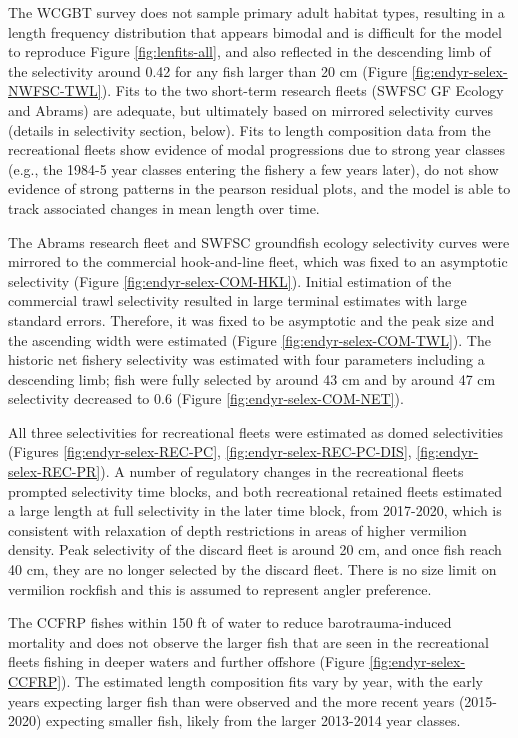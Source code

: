 \documentclass[
  english,
  a4paper,
]{article}
\begin{document}
The WCGBT survey does not sample primary adult habitat types, resulting in a length frequency distribution that appears bimodal and is difficult for the model to reproduce Figure \ref{fig:lenfits-all}, and also reflected in the descending limb of the selectivity around 0.42 for any fish larger than 20 cm (Figure \ref{fig:endyr-selex-NWFSC-TWL}). Fits to the two short-term research fleets (SWFSC GF Ecology and Abrams) are adequate, but ultimately based on mirrored selectivity curves (details in selectivity section, below). Fits to length composition data from the recreational fleets show evidence of modal progressions due to strong year classes (e.g., the 1984-5 year classes entering the fishery a few years later), do not show evidence of strong patterns in the pearson residual plots, and the model is able to track associated changes in mean length over time.

The Abrams research fleet and SWFSC groundfish ecology selectivity curves were mirrored to the commercial hook-and-line fleet, which was fixed to an asymptotic selectivity (Figure \ref{fig:endyr-selex-COM-HKL}). Initial estimation of the commercial trawl selectivity resulted in large terminal estimates with large standard errors. Therefore, it was fixed to be asymptotic and the peak size and the ascending width were estimated (Figure \ref{fig:endyr-selex-COM-TWL}). The historic net fishery selectivity was estimated with four parameters including a descending limb; fish were fully selected by around 43 cm and by around 47 cm selectivity decreased to 0.6 (Figure \ref{fig:endyr-selex-COM-NET}).

All three selectivities for recreational fleets were estimated as domed selectivities (Figures \ref{fig:endyr-selex-REC-PC}, \ref{fig:endyr-selex-REC-PC-DIS}, \ref{fig:endyr-selex-REC-PR}). A number of regulatory changes in the recreational fleets prompted selectivity time blocks, and both recreational retained fleets estimated a large length at full selectivity in the later time block, from 2017-2020, which is consistent with relaxation of depth restrictions in areas of higher vermilion density. Peak selectivity of the discard fleet is around 20 cm, and once fish reach 40 cm, they are no longer selected by the discard fleet. There is no size limit on vermilion rockfish and this is assumed to represent angler preference.

The CCFRP fishes within 150 ft of water to reduce barotrauma-induced mortality and does not observe the larger fish that are seen in the recreational fleets fishing in deeper waters and further offshore (Figure \ref{fig:endyr-selex-CCFRP}). The estimated length composition fits vary by year, with the early years expecting larger fish than were observed and the more recent years (2015-2020) expecting smaller fish, likely from the larger 2013-2014 year classes.
\end{document}

